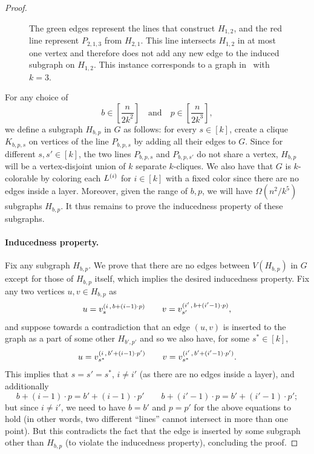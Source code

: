 \documentclass[11pt]{article}
\theoremstyle{definition}
\begin{document}
\begin{proof}
\begin{figure}[h!]
\begin{tikzpicture}[scale=1.25, every node/.style={scale=0.9}]
\end{tikzpicture}


\caption{The green edges represent the lines that construct $H_{1,2}$, and the red line represent $P_{2, 1, 3}$ from $H_{2, 1}$. This line intersects $H_{1, 2}$ in at most one vertex and therefore does not add any new edge to the induced subgraph on $H_{1, 2}$. This instance corresponds to a graph in~ with $k=3$.}
\label{fig:paths-lem} 
\end{figure}

	
	For any choice of 
	\[
		b \in [\frac{n}{2k^2}] \quad \text{and}\quad p\in [\frac{n}{2k^3}],
	\]
	we define a subgraph $H_{b,p}$ in $G$ as follows: for every $s \in [k]$, create a clique $K_{b,p,s}$ on vertices of the line $P_{b,p,s}$ by adding all their edges to $G$.
	Since for different $s,s' \in [k]$, the two lines $P_{b,p,s}$ and $P_{b,p,s'}$ do not share a vertex, $H_{b,p}$ will be a vertex-disjoint union of $k$ separate $k$-cliques. 
	We also have that $G$ is $k$-colorable by coloring each $L^{(i)}$ for $i \in [k]$ with a fixed color since there are no edges inside a layer. 
	Moreover, given the range of $b,p$, we will have $\Omega(n^2/k^5)$ subgraphs $H_{b,p}$. It thus remains to prove the inducedness property of these subgraphs. 
	
	\paragraph{Inducedness property.} Fix any subgraph $H_{b,p}$. We prove that there are no edges between $V(H_{b,p})$ in $G$ except for those of $H_{b,p}$ itself, which implies the desired
	inducedness property. Fix any two vertices $u,v \in H_{b,p}$ as 
	\[
		u = v^{(i\,,\,b + (i-1) \cdot p)}_s \qquad v = v^{(i'\,,\,b + (i'-1) \cdot p)}_{s'},
	\]
	and suppose towards a contradiction that an edge $(u,v)$ is inserted to the graph as a part of some other $H_{b',p'}$ and so we also have, for some $s^* \in [k]$, 
	\[
		u = v^{(i\,,\,b' + (i-1) \cdot p')}_{s^*} \qquad v = v^{(i'\,,\,b' + (i'-1) \cdot p')}_{s^*}. 
	\]
	This implies that $s = s' = s^*$, $i \neq i'$ (as there are no edges inside a layer), and additionally 
	\[
		b + (i-1) \cdot p = b' + (i-1) \cdot p' \qquad b+(i'-1) \cdot p = b' + (i'-1) \cdot p';
	\]
	but since $i \neq i'$, we need to have $b=b'$ and $p=p'$ for the above equations to hold (in other words, two different ``lines'' cannot intersect in more than one point). 
	But this contradicts the fact that the edge is inserted by some subgraph other than $H_{b,p}$ (to violate the inducedness property), concluding the proof. 
\end{proof}
\end{document}
